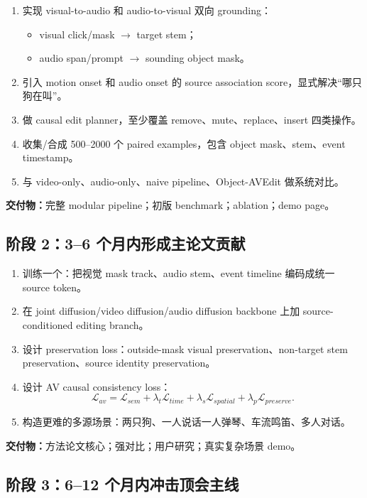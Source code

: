 \begin{enumerate}[leftmargin=2em]
  \item 实现 visual-to-audio 和 audio-to-visual 双向 grounding：
  \begin{itemize}
    \item visual click/mask $\rightarrow$ target stem；
    \item audio span/prompt $\rightarrow$ sounding object mask。
  \end{itemize}
  \item 引入 motion onset 和 audio onset 的 source association score，显式解决“哪只狗在叫”。
  \item 做 causal edit planner，至少覆盖 remove、mute、replace、insert 四类操作。
  \item 收集/合成 500--2000 个 paired examples，包含 object mask、stem、event timestamp。
  \item 与 video-only、audio-only、naive pipeline、Object-AVEdit 做系统对比。
\end{enumerate}

\textbf{交付物：}完整 modular pipeline；初版 benchmark；ablation；demo page。

\subsection{阶段 2：3--6 个月内形成主论文贡献}

\begin{enumerate}[leftmargin=2em]
  \item 训练一个：把视觉 mask track、audio stem、event timeline 编码成统一 source token。
  \item 在 joint diffusion/video diffusion/audio diffusion backbone 上加 source-conditioned editing branch。
  \item 设计 preservation loss：outside-mask visual preservation、non-target stem preservation、source identity preservation。
  \item 设计 AV causal consistency loss：
  \[
  \mathcal{L}_{av}=\mathcal{L}_{sem}+\lambda_t\mathcal{L}_{time}+\lambda_s\mathcal{L}_{spatial}+\lambda_p\mathcal{L}_{preserve}.
  \]
  \item 构造更难的多源场景：两只狗、一人说话一人弹琴、车流鸣笛、多人对话。
\end{enumerate}

\textbf{交付物：}方法论文核心；强对比；用户研究；真实复杂场景 demo。

\subsection{阶段 3：6--12 个月内冲击顶会主线}

